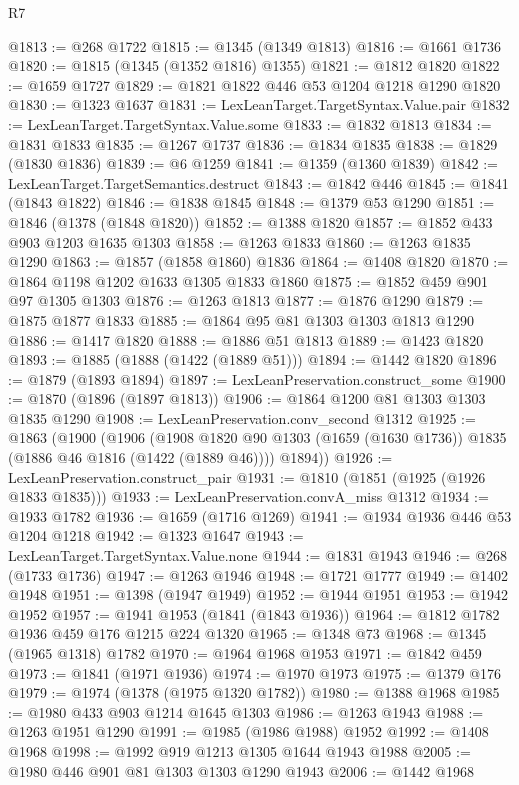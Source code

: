 \begin{lexlean}{R7}
\begin{coremodule}
@1813 := @268 @1722
@1815 := @1345 (@1349 @1813)
@1816 := @1661 @1736
@1820 := @1815 (@1345 (@1352 @1816) @1355)
@1821 := @1812 @1820
@1822 := @1659 @1727
@1829 := @1821 @1822 @446 @53 @1204 @1218 @1290 @1820
@1830 := @1323 @1637
@1831 := LexLeanTarget.TargetSyntax.Value.pair
@1832 := LexLeanTarget.TargetSyntax.Value.some
@1833 := @1832 @1813
@1834 := @1831 @1833
@1835 := @1267 @1737
@1836 := @1834 @1835
@1838 := @1829 (@1830 @1836)
@1839 := @6 @1259
@1841 := @1359 (@1360 @1839)
@1842 := LexLeanTarget.TargetSemantics.destruct
@1843 := @1842 @446
@1845 := @1841 (@1843 @1822)
@1846 := @1838 @1845
@1848 := @1379 @53 @1290
@1851 := @1846 (@1378 (@1848 @1820))
@1852 := @1388 @1820
@1857 := @1852 @433 @903 @1203 @1635 @1303
@1858 := @1263 @1833
@1860 := @1263 @1835 @1290
@1863 := @1857 (@1858 @1860) @1836
@1864 := @1408 @1820
@1870 := @1864 @1198 @1202 @1633 @1305 @1833 @1860
@1875 := @1852 @459 @901 @97 @1305 @1303
@1876 := @1263 @1813
@1877 := @1876 @1290
@1879 := @1875 @1877 @1833
@1885 := @1864 @95 @81 @1303 @1303 @1813 @1290
@1886 := @1417 @1820
@1888 := @1886 @51 @1813
@1889 := @1423 @1820
@1893 := @1885 (@1888 (@1422 (@1889 @51)))
@1894 := @1442 @1820
@1896 := @1879 (@1893 @1894)
@1897 := LexLeanPreservation.construct_some
@1900 := @1870 (@1896 (@1897 @1813))
@1906 := @1864 @1200 @81 @1303 @1303 @1835 @1290
@1908 := LexLeanPreservation.conv_second @1312
@1925 := @1863
    (@1900
      (@1906
        (@1908 @1820 @90 @1303 (@1659 (@1630 @1736)) @1835 (@1886 @46 @1816 (@1422 (@1889 @46))))
        @1894))
@1926 := LexLeanPreservation.construct_pair
@1931 := @1810 (@1851 (@1925 (@1926 @1833 @1835)))
@1933 := LexLeanPreservation.convA_miss @1312
@1934 := @1933 @1782
@1936 := @1659 (@1716 @1269)
@1941 := @1934 @1936 @446 @53 @1204 @1218
@1942 := @1323 @1647
@1943 := LexLeanTarget.TargetSyntax.Value.none
@1944 := @1831 @1943
@1946 := @268 (@1733 @1736)
@1947 := @1263 @1946
@1948 := @1721 @1777
@1949 := @1402 @1948
@1951 := @1398 (@1947 @1949)
@1952 := @1944 @1951
@1953 := @1942 @1952
@1957 := @1941 @1953 (@1841 (@1843 @1936))
@1964 := @1812 @1782 @1936 @459 @176 @1215 @224 @1320
@1965 := @1348 @73
@1968 := @1345 (@1965 @1318) @1782
@1970 := @1964 @1968 @1953
@1971 := @1842 @459
@1973 := @1841 (@1971 @1936)
@1974 := @1970 @1973
@1975 := @1379 @176
@1979 := @1974 (@1378 (@1975 @1320 @1782))
@1980 := @1388 @1968
@1985 := @1980 @433 @903 @1214 @1645 @1303
@1986 := @1263 @1943
@1988 := @1263 @1951 @1290
@1991 := @1985 (@1986 @1988) @1952
@1992 := @1408 @1968
@1998 := @1992 @919 @1213 @1305 @1644 @1943 @1988
@2005 := @1980 @446 @901 @81 @1303 @1303 @1290 @1943
@2006 := @1442 @1968

\end{coremodule}
\end{lexlean}
